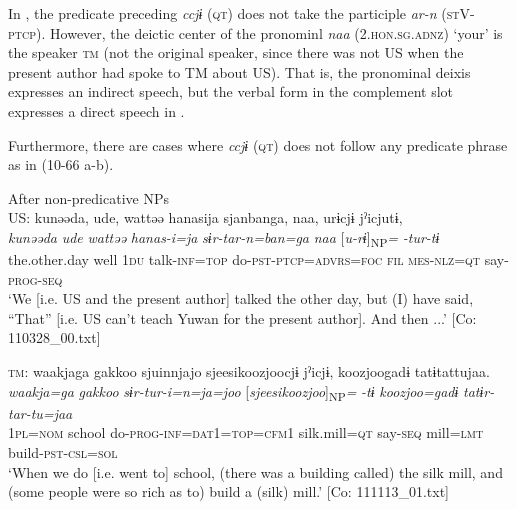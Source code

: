 In , the predicate preceding \textit{ccjɨ} (\textsc{qt}) does not take the participle \textit{ar-n} (\textsc{st}V-\textsc{ptcp}). However, the deictic center of the pronominl \textit{naa} (2.\textsc{hon}.\textsc{sg}.\textsc{adnz}) ‘your’ is the speaker \textsc{tm} (not the original speaker, since there was not US when the present author had spoke to TM about US). That is, the pronominal deixis expresses an indirect speech, but the verbal form in the complement slot expresses a direct speech in .

  Furthermore, there are cases where \textit{ccjɨ} (\textsc{qt}) does not follow any predicate phrase as in (10-66 a-b).

\ea\label{ex:10.66}   After non-predicative NPs\\
  \ea  US: \glll kunəəda,  ude,  wattəə  hanasija  sjanbanga,   naa,  urɨcjɨ  jˀicjutɨ,\\
      \textit{kunəəda}  \textit{ude}  \textit{wattəə}  \textit{hanas-i=ja}  \textit{sɨr-tar-n=ban=ga}  \textit{naa}  [\textit{u-rɨ}]\textsubscript{NP}\textit{=}  \textit{-tur-tɨ}\\
      the.other.day  well  1\textsc{du}  talk-\textsc{inf}=\textsc{top}  do-\textsc{pst}-\textsc{ptcp}=\textsc{advrs}=\textsc{foc}  \textsc{fil}  \textsc{mes}-\textsc{nlz}=\textsc{qt}  say-\textsc{prog}-\textsc{seq}\\
      \glt       ‘We [i.e. US and the present author] talked the other day, but (I) have said, “That” [i.e. US can’t teach Yuwan for the present author]. And then ...’ [Co: 110328\_00.txt]

  \ex  \textsc{tm}:     \glll    waakjaga  {\textbar}gakkoo{\textbar}  sjuinnjajo  {\textbar}sjeesikoozjoo{\textbar}cjɨ    jˀicjɨ,  {\textbar}koozjoo{\textbar}gadɨ  tatɨtattujaa.\\
      \textit{waakja=ga}  \textit{gakkoo}  \textit{sɨr-tur-i=n=ja=joo}  [\textit{sjeesikoozjoo}]\textsubscript{NP}\textit{=}  \textit{-tɨ}  \textit{koozjoo=gadɨ}  \textit{tatɨr-tar-tu=jaa}\\
      1\textsc{pl}=\textsc{nom}  school  do{}-\textsc{prog}-\textsc{inf}=\textsc{dat}1=\textsc{top}=\textsc{cfm}1  silk.mill=\textsc{qt} say-\textsc{seq}  mill=\textsc{lmt}  build-\textsc{pst}-\textsc{csl}=\textsc{sol}\\
      \glt       ‘When we do [i.e. went to] school, (there was a building called) the silk mill, and (some people were so rich as to) build a (silk) mill.’ [Co: 111113\_01.txt]
    \z
\z

